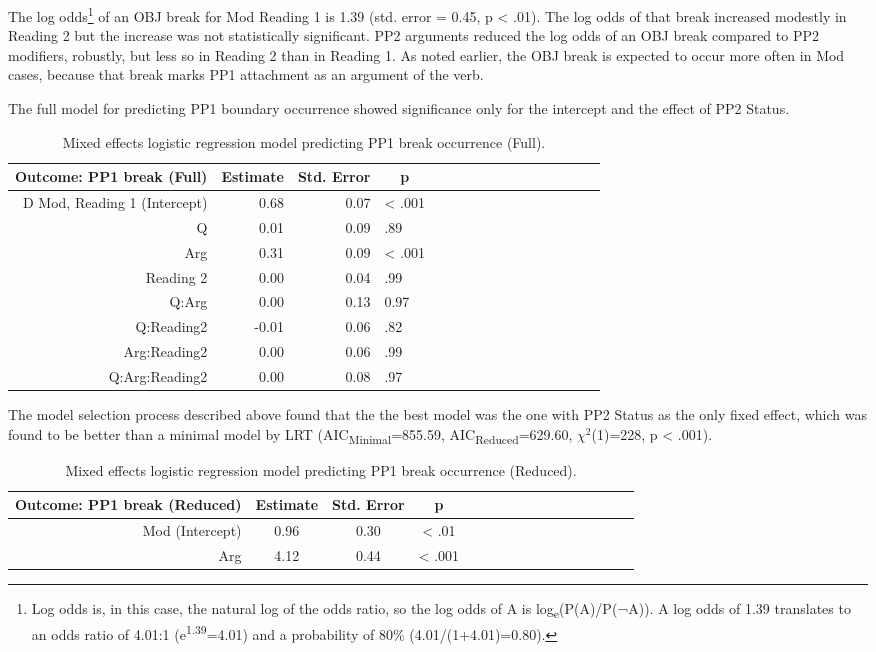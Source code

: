 \documentclass[11pt,oneside]{book}
\let\rmarkdownfootnote\footnote%
\def\footnote{\protect\rmarkdownfootnote}
\begin{document}
The log odds\footnote{Log odds is, in this case, the natural log of the odds ratio, so the log odds of A is log\textsubscript{e}(P(A)/P(¬A)). A log odds of 1.39 translates to an odds ratio of 4.01:1 (e\textsuperscript{1.39}=4.01) and a probability of 80\% (4.01/(1+4.01)=0.80).} of an OBJ break for Mod Reading 1 is 1.39 (std. error = 0.45, p \textless{} .01). The log odds of that break increased modestly in Reading 2 but the increase was not statistically significant. PP2 arguments reduced the log odds of an OBJ break compared to PP2 modifiers, robustly, but less so in Reading 2 than in Reading 1. As noted earlier, the OBJ break is expected to occur more often in Mod cases, because that break marks PP1 attachment as an argument of the verb.

The full model for predicting PP1 boundary occurrence showed significance only for the intercept and the effect of PP2 Status.

\begin{table}[!h]

\caption{\label{tab:fullpp1Mod}Mixed effects logistic regression model predicting PP1 break occurrence (Full).}
\centering
\begin{tabular}{rrrlrrrlrrrlrrrl}
\toprule
\multicolumn{1}{c}{Outcome: PP1 break (Full)} & \multicolumn{1}{c}{Estimate} & \multicolumn{1}{c}{Std. Error} & \multicolumn{1}{c}{p}\\
\midrule
D Mod, Reading 1 (Intercept) & 0.68 & 0.07 & < .001\\
Q & 0.01 & 0.09 & .89\\
Arg & 0.31 & 0.09 & < .001\\
Reading 2 & 0.00 & 0.04 & .99\\
Q:Arg & 0.00 & 0.13 & 0.97\\
\addlinespace
Q:Reading2 & -0.01 & 0.06 & .82\\
Arg:Reading2 & 0.00 & 0.06 & .99\\
Q:Arg:Reading2 & 0.00 & 0.08 & .97\\
\bottomrule
\end{tabular}
\end{table}

The model selection process described above found that the the best model was the one with PP2 Status as the only fixed effect, which was found to be better than a minimal model by LRT (AIC\textsubscript{Minimal}=855.59, AIC\textsubscript{Reduced}=629.60, \(\chi^2\)(1)=228, p \textless{} .001).

\begin{table}[!h]

\caption{\label{tab:pp1Mod}Mixed effects logistic regression model predicting PP1 break occurrence (Reduced).}
\centering
\begin{tabular}{rcccrcccrcccrccc}
\toprule
\multicolumn{1}{c}{Outcome: PP1 break (Reduced)} & \multicolumn{1}{c}{Estimate} & \multicolumn{1}{c}{Std. Error} & \multicolumn{1}{c}{p}\\
\midrule
Mod (Intercept) & 0.96 & 0.30 & < .01\\
Arg & 4.12 & 0.44 & < .001\\
\bottomrule
\end{tabular}
\end{table}
\end{document}
